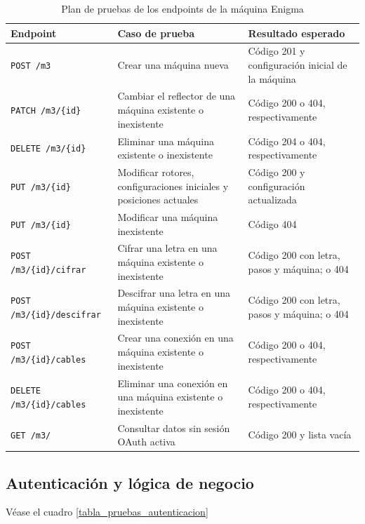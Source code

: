 \begin{table}[htbp]
	\centering
	\begin{tabular}{|p{4cm}|p{5cm}|p{3cm}|}
		\hline
		\textbf{Endpoint} & \textbf{Caso de prueba} & \textbf{Resultado esperado} \\
		\hline
		\texttt{POST /m3} & Crear una máquina nueva & Código 201 y configuración inicial de la máquina \\
		\hline
		\texttt{PATCH /m3/\{id\}} & Cambiar el reflector de una máquina existente o inexistente & Código 200 o 404, respectivamente \\
		\hline
		\texttt{DELETE /m3/\{id\}} & Eliminar una máquina existente o inexistente & Código 204 o 404, respectivamente \\
		\hline
		\texttt{PUT /m3/\{id\}} & Modificar rotores, configuraciones iniciales y posiciones actuales & Código 200 y configuración actualizada \\
		\hline
		\texttt{PUT /m3/\{id\}} & Modificar una máquina inexistente & Código 404 \\
		\hline
		\texttt{POST /m3/\{id\}/cifrar} & Cifrar una letra en una máquina existente o inexistente & Código 200 con letra, pasos y máquina; o 404 \\
		\hline
		\texttt{POST /m3/\{id\}/descifrar} & Descifrar una letra en una máquina existente o inexistente & Código 200 con letra, pasos y máquina; o 404 \\
		\hline
		\texttt{POST /m3/\{id\}/cables} & Crear una conexión en una máquina existente o inexistente & Código 200 o 404, respectivamente \\
		\hline
		\texttt{DELETE /m3/\{id\}/cables} & Eliminar una conexión en una máquina existente o inexistente & Código 200 o 404, respectivamente \\
		\hline
		\texttt{GET /m3/} & Consultar datos sin sesión OAuth activa & Código 200 y lista vacía \\
		\hline
	\end{tabular}
	\caption{Plan de pruebas de los endpoints de la máquina Enigma}
	\label{tabla_pruebas_m3}
\end{table}

\subsection{Autenticación y lógica de negocio}

Véase el cuadro \ref{tabla_pruebas_autenticacion}

